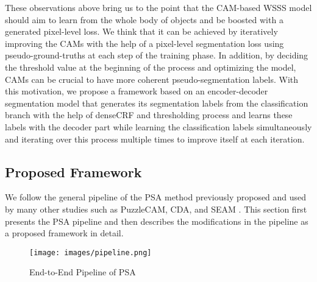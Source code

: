 \documentclass[sn-mathphys]{sn-jnl}
\theoremstyle{thmstyleone}
\theoremstyle{thmstyletwo}\newtheorem{example}{Example}\newtheorem{remark}{Remark}
\theoremstyle{thmstylethree}\newtheorem{definition}{Definition}
\begin{document}
These observations above bring us to the point that the CAM-based WSSS model should aim to learn from the whole body of objects and be boosted with a generated pixel-level loss. We think that it can be achieved by iteratively improving the CAMs with the help of a pixel-level segmentation loss using pseudo-ground-truths at each step of the training phase. In addition, by deciding the threshold value at the beginning of the process and optimizing the model, CAMs can be crucial to have more coherent pseudo-segmentation labels. With this motivation, we propose a framework based on an encoder-decoder segmentation model that generates its segmentation labels from the classification branch with the help of denseCRF and thresholding process and learns these labels with the decoder part while learning the classification labels simultaneously and iterating over this process multiple times to improve itself at each iteration.


\subsection{Proposed Framework}\label{proposed_framework}

We follow the general pipeline of the PSA method \cite{DBLP:journals/corr/abs-1803-10464} previously proposed and used by many other studies such as PuzzleCAM, CDA, and SEAM \cite{jo2021puzzlecam, cda, seam}. This section first presents the PSA pipeline and then describes the modifications in the pipeline as a proposed framework in detail. 

\begin{figure}[H]
    \centering
    \texttt{[image: images/pipeline.png]}
    \caption{End-to-End Pipeline of PSA}
    \label{end2end_pipeline}
\end{figure}
\end{document}
